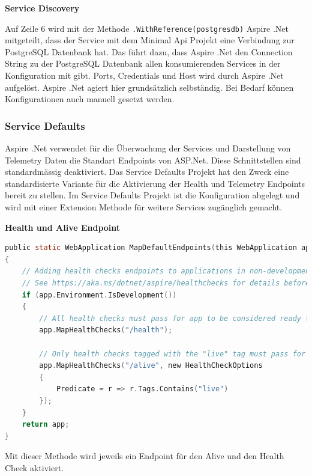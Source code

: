             \textbf{Service Discovery}
            
            Auf Zeile 6 wird mit der Methode \verb|.WithReference(postgresdb)| Aspire .Net mitgeteilt, dass der Service mit dem Minimal Api Projekt eine Verbindung zur PostgreSQL Datenbank hat. Das führt dazu, dass Aspire .Net den Connection String zu der PostgreSQL Datenbank allen konsumierenden Services in der Konfiguration mit gibt. Ports, Credentials und Host wird durch Aspire .Net aufgelöst. Aspire .Net agiert hier grundsätzlich selbständig. Bei Bedarf können Konfigurationen auch manuell gesetzt werden.
            
        \subsubsection{Service Defaults}
            
            Aspire .Net verwendet für die Überwachung der Services und Darstellung von Telemetry Daten die Standart Endpoints von ASP.Net. Diese Schnittstellen sind standardmässig deaktiviert. Das Service Defaults Projekt hat den Zweck eine standardisierte Variante für die Aktivierung der Health und Telemetry Endpoints bereit zu stellen. Im Service Defaults Projekt ist die Konfiguration abgelegt und wird mit einer Extension Methode für weitere Services zugänglich gemacht.

            \textbf{Health und Alive Endpoint}
            
            \begin{lstlisting}[language=C, caption=Konfiguration von Healthcheck Endpoints in den Service Defaults]         
public static WebApplication MapDefaultEndpoints(this WebApplication app)
{
    // Adding health checks endpoints to applications in non-development environments has security implications.
    // See https://aka.ms/dotnet/aspire/healthchecks for details before enabling these endpoints in non-development environments.
    if (app.Environment.IsDevelopment())
    {
        // All health checks must pass for app to be considered ready to accept traffic after starting
        app.MapHealthChecks("/health");

        // Only health checks tagged with the "live" tag must pass for app to be considered alive
        app.MapHealthChecks("/alive", new HealthCheckOptions
        {
            Predicate = r => r.Tags.Contains("live")
        });
    }
    return app;
}
            \end{lstlisting}
            Mit dieser Methode wird jeweils ein Endpoint für den Alive und den Health Check aktiviert.

